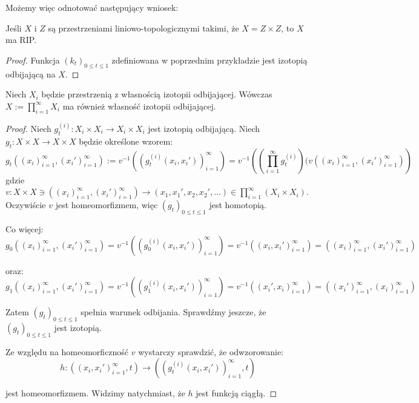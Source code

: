   Możemy więc odnotować następujący wniosek:
\begin{cor} \label{cor:rip-space}
  Jeśli $X$ i $Z$ są przestrzeniami liniowo-topologicznymi takimi, że $X = Z \times Z$, to $X$ ma RIP.
  \begin{proof}
    Funkcja $(k_t)_{0 \leq t \leq 1}$ zdefiniowana w poprzednim przykładzie jest izotopią odbijającą na $X$.
  \end{proof}
\end{cor}


\begin{ex} \label{rip-product}
  Niech $X_i$ będzie przestrzenią z własnością izotopii odbijającej. Wówczas $X := \prod_{i=1}^\infty X_i$ ma również własność izotopii odbijającej.
  \begin{proof}
    Niech $g_t^{(i)}: X_i \times X_i \rightarrow X_i \times X_i$ jest izotopią odbijającą.
    Niech $g_t: X \times X \to X \times X$ będzie określone wzorem:
    \begin{equation*} \label{rip-product-def}
      g_t((x_i)_{i=1}^\infty, (x_i')_{i=1}^\infty) :=
      v^{-1}((g_t^{(i)}(x_i, x_i'))_{i=1}^\infty) =
      v^{-1}\left(\left(\prod_{i=1}^\infty g_t^{(i)}\right)(v((x_i)_{i=1}^\infty, (x_i')_{i=1}^\infty)\right)
    \end{equation*}
    gdzie $v: X \times X \ni ((x_i)_{i=1}^\infty, (x_i')_{i=1}^\infty) \rightarrow (x_1, x_1', x_2, x_2', \ldots) \in \prod_{i=1}^\infty (X_i \times X_i)$. Oczywiście $v$ jest homeomorfizmem, więc $(g_t)_{0 \leq t \leq 1}$ jest homotopią.
    
    Co więcej:
    \[
      g_0((x_i)_{i=1}^\infty, (x_i')_{i=1}^\infty) =
      v^{-1}((g_0^{(i)}(x_i, x_i'))_{i=1}^\infty) =
      v^{-1}((x_i, x_i')_{i=1}^\infty) = ((x_i)_{i=1}^\infty, (x_i')_{i=1}^\infty)
    \]
    
    oraz:
    \[
      g_1((x_i)_{i=1}^\infty, (x_i')_{i=1}^\infty) =
      v^{-1}((g_1^{(i)}(x_i, x_i'))_{i=1}^\infty) =
      v^{-1}((x_i', x_i)_{i=1}^\infty) = ((x_i')_{i=1}^\infty, (x_i)_{i=1}^\infty)
    \]
    
    Zatem $(g_t)_{0 \leq t \leq 1}$ spełnia warunek odbijania. Sprawdźmy jeszcze, że $(g_t)_{0 \leq t \leq 1}$ jest izotopią.
    
    Ze względu na homeomorficzność $v$ wystarczy sprawdzić, że odwzorowanie:
    \[h: ((x_i, x_i')_{i=1}^\infty, t) \rightarrow ((g_t^{(i)}(x_i, x_i'))_{i=1}^\infty, t)\]
    
    jest homeomorfizmem. Widzimy natychmiast, że $h$ jest funkcją ciągłą.
    

\end{proof}
\end{ex}
